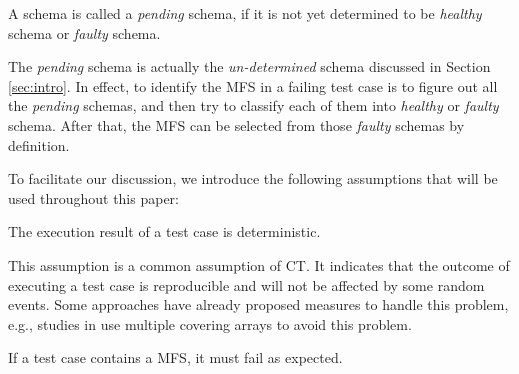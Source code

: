 \documentclass{sig-alternate-05-2015}
\begin{document}

\begin{definition}\label{de:pending}
A schema is called a \emph{pending} schema, if it is not yet determined to be \emph{healthy} schema or \emph{faulty} schema.
\end{definition}

The \emph{pending} schema is actually the \emph{un-determined} schema discussed in Section \ref{sec:intro}. In effect, to identify the MFS in a failing test case is to figure out all the \emph{pending} schemas, and then try to classify each of them into \emph{healthy} or \emph{faulty} schema. After that, the MFS can be selected from those \emph{faulty} schemas by definition.

%

To facilitate our discussion, we introduce the following assumptions that will be used throughout this paper:

\begin{assumption}  The execution result of a test case is deterministic.
\end{assumption}

This assumption is a common assumption of CT\cite{zhang2011characterizing,ghandehari2012identifying,niu2013identifying}. It indicates that the outcome of executing a test case is reproducible and will not be affected by some random events. Some approaches have already proposed measures to handle this problem, e.g., studies in \cite{yilmaz2006covering,fouche2009incremental} use multiple covering arrays to avoid this problem.

\begin{assumption} If a test case contains a MFS, it must fail as expected.
\end{assumption}
\end{document}
